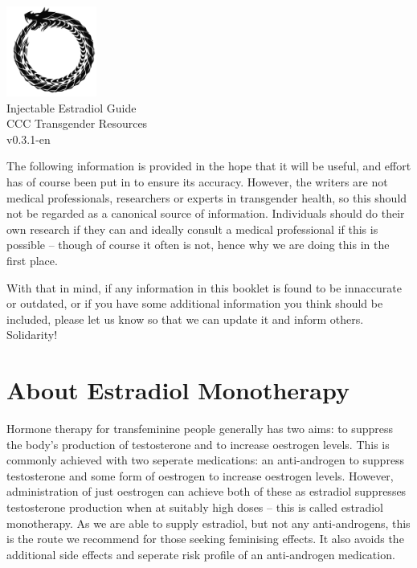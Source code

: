 \documentclass[twoside,a5paper]{article}
\begin{document}
\begin{titlepage}
  \begin{center}
    \includegraphics[width=8em]{ouroboros} \\
    \vspace{3em}
    {\LARGE Injectable Estradiol Guide \\}
    \vspace{2em}
    {\large CCC Transgender Resources \\}
    \vspace{0.6em}
    {\large v0.3.1-en \\}
  \end{center}
\end{titlepage}

\tableofcontents
\listoftables
\listoffigures

\newpage
\setcounter{page}{1}

\noindent The following information is provided in the hope that it
will be useful, and effort has of course been put in to ensure its
accuracy.  However, the writers are not medical professionals,
researchers or experts in transgender health, so this should not be
regarded as a canonical source of information.  Individuals should do
their own research if they can and ideally consult a medical
professional if this is possible -- though of course it often is not,
hence why we are doing this in the first place.

With that in mind, if any information in this booklet is found to be
innaccurate or outdated, or if you have some additional information
you think should be included, please let us know so that we can update
it and inform others.  Solidarity!

\section{About Estradiol Monotherapy}

Hormone therapy for transfeminine people generally has two aims: to
suppress the body's production of testosterone and to increase
oestrogen levels.  This is commonly achieved with two seperate
medications: an anti-androgen to suppress testosterone and some form
of oestrogen to increase oestrogen levels.  However, administration of
just oestrogen can achieve both of these as estradiol suppresses
testosterone production when at suitably high doses -- this is called
estradiol monotherapy.  As we are able to supply estradiol, but not
any anti-androgens, this is the route we recommend for those seeking
feminising effects.  It also avoids the additional side effects and
seperate risk profile of an anti-androgen medication.
\end{document}
